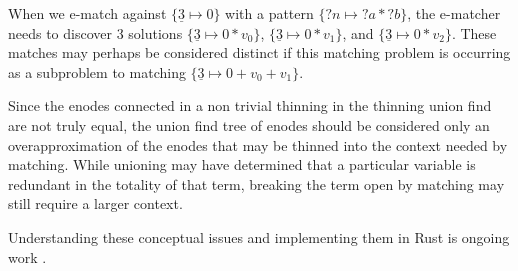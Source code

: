 \documentclass{article}%
\begin{document}
When we e-match against $\{ \underline{3} \mapsto 0 \}$ with a pattern $\{ ?n \mapsto ?a * ?b \} $, the e-matcher needs to discover 3 solutions $\{ \underline{3} \mapsto 0 * v_0 \}$, $\{ \underline{3} \mapsto 0 * v_1 \}$, and $\{ \underline{3} \mapsto 0 * v_2 \}$. These matches may perhaps be considered distinct if this matching problem is occurring as a subproblem to matching $\{ \underline{3} \mapsto 0 + v_0 + v_1 \}$. 

Since the enodes connected in a non trivial thinning in the thinning union find are not truly equal, the union find tree of enodes should be considered only an overapproximation of the enodes that may be thinned into the context needed by matching. While unioning may have determined that a particular variable is redundant in the totality of that term, breaking the term open by matching may still require a larger context.

Understanding these conceptual issues and implementing them in Rust is ongoing work \cite{zucker2026microeggpythin}.









\end{document}
